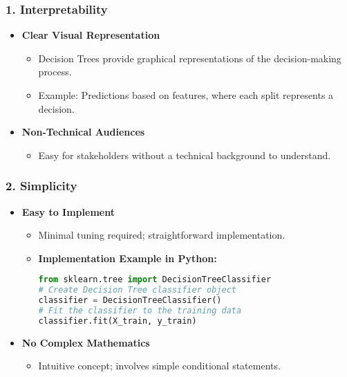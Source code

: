 \documentclass[aspectratio=169]{beamer}
\begin{document}
\begin{frame}[fragile]
    \frametitle{1. Interpretability}
    \begin{itemize}
        \item \textbf{Clear Visual Representation}
            \begin{itemize}
                \item Decision Trees provide graphical representations of the decision-making process.
                \item Example: Predictions based on features, where each split represents a decision.
            \end{itemize}
        \item \textbf{Non-Technical Audiences}
            \begin{itemize}
                \item Easy for stakeholders without a technical background to understand.
            \end{itemize}
    \end{itemize}
\end{frame}

\begin{frame}[fragile]
    \frametitle{2. Simplicity}
    \begin{itemize}
        \item \textbf{Easy to Implement}
            \begin{itemize}
                \item Minimal tuning required; straightforward implementation.
                \item \textbf{Implementation Example in Python:}
                \begin{lstlisting}[language=Python]
from sklearn.tree import DecisionTreeClassifier
# Create Decision Tree classifier object
classifier = DecisionTreeClassifier()
# Fit the classifier to the training data
classifier.fit(X_train, y_train)
                \end{lstlisting}
            \end{itemize}
        \item \textbf{No Complex Mathematics}
            \begin{itemize}
                \item Intuitive concept; involves simple conditional statements.
            \end{itemize}
    \end{itemize}
\end{frame}
\end{document}
